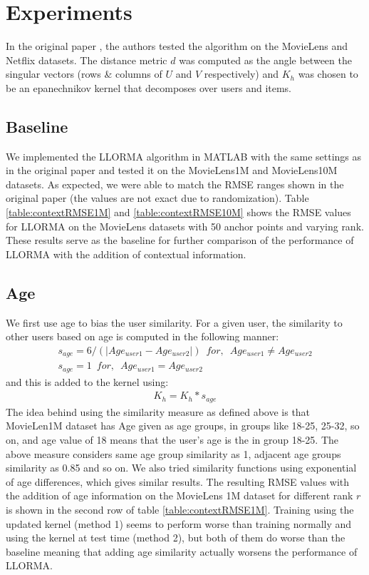 \documentclass[10 pt,table]{article}  %
\begin{document}
\section{Experiments}
In the original paper \cite{lee2013local}, the authors tested the algorithm on the MovieLens and Netflix datasets. The distance metric $d$ was computed as the angle between the singular vectors (rows \& columns of $U$ and $V$ respectively) and $K_h$ was chosen to be an epanechnikov kernel that decomposes over users and items. 
 
\subsection{Baseline}
We implemented the LLORMA algorithm in MATLAB with the same settings as in the original paper and tested it on the MovieLens1M and MovieLens10M datasets. As expected, we were able to match the RMSE ranges shown in the original paper (the values are not exact due to randomization). Table \ref{table:contextRMSE1M} and \ref{table:contextRMSE10M} shows the RMSE values for LLORMA on the MovieLens datasets with 50 anchor points and varying rank. These results serve as the baseline for further comparison of the performance of LLORMA with the addition of contextual information.

\subsection{Age}
We first use age to bias the user similarity. For a given user, the similarity to other users based on age is computed in the following manner:
\begin{align}
s_{age} = 6 / (|Age_{user1} - Age_{user2}|) \,\,\, for,\,\,\, Age_{user1} \neq Age_{user2} \\
s_{age} = 1 \,\,\, for,\,\,\, Age_{user1} = Age_{user2}
\end{align} \label{eq:simAge}
and this is added to the kernel using:
\begin{align}
K_h = K_h * s_{age}
\end{align} \label{eq:kernelAge}
The idea behind using the similarity measure as defined above is that MovieLen1M dataset has Age given as age groups, in groups like 18-25, 25-32, so on, and age value of 18 means that the user's age is the in group 18-25. The above measure considers same age group similarity as 1, adjacent age groups similarity as 0.85 and so on. We also tried similarity functions using exponential of age differences, which gives similar results. The resulting RMSE values with the addition of age information on the MovieLens 1M dataset for different rank $r$ is shown in the second row of table \ref{table:contextRMSE1M}. Training using the updated kernel (method 1) seems to perform worse than training normally and using the kernel at test time (method 2), but both of them do worse than the baseline meaning that adding age similarity actually worsens the performance of LLORMA.
\end{document}
